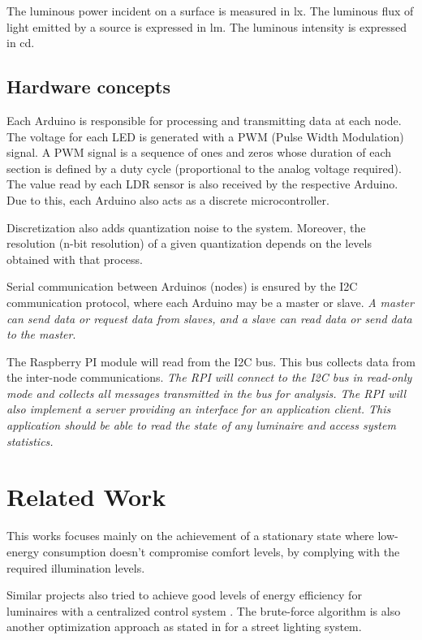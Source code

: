 \documentclass[english,fira]{ist-report}
\begin{document}
The luminous power incident on a surface is measured in \si{\lux}. The luminous flux of light emitted by a source is expressed in \si{\lumen}. The luminous intensity is expressed in \si{\candela}.

\subsection{Hardware concepts}

Each Arduino is responsible for processing and transmitting data at each node. The voltage for each LED is generated with a PWM (Pulse Width Modulation) signal. A PWM signal is a sequence of ones and zeros whose duration of each section is defined by a duty cycle (proportional to the analog voltage required). The value read by each LDR sensor is also received by the respective Arduino. Due to this, each Arduino also acts as a discrete microcontroller.

Discretization also adds quantization noise to the system. Moreover, the resolution (n-bit resolution) of a given quantization depends on the levels obtained with that process.

Serial communication between Arduinos (nodes) is ensured by the I2C communication protocol, where each Arduino may be a master or slave. \textit{A master can send data or request data from slaves, and a slave can read data or send data to the master}.

The Raspberry PI module will read from the I2C bus. This bus collects data from the inter-node communications.
\textit{The RPI will connect to the I2C bus in read-only mode and collects all messages transmitted in the bus for analysis. The RPI will also implement a server providing an interface for an application client. This application should be able to read the state of any luminaire and access system statistics.}

\section{Related Work}

This works focuses mainly on the achievement of a stationary state where low-energy consumption doesn't compromise comfort levels, by complying with the required illumination levels.

Similar projects also tried to achieve good levels of energy efficiency for luminaires with a centralized control system \cite{pandharipande2015centralized}. The brute-force algorithm is also another optimization approach as stated in \cite{mahoor2017hierarchical} for a street lighting system.
\end{document}
